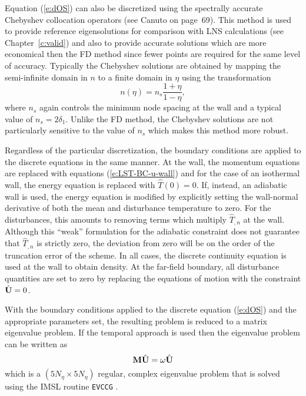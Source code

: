 Equation (\ref{e:dOS}) can also be discretized using the spectrally accurate
Chebyshev collocation operators (see Canuto \etal \cite{CaHuQuZa:88} on
page~69).  This method is used to provide reference eigensolutions for
comparison with LNS calculations (see Chapter~\ref{c:valid}) and also to
provide accurate solutions which are more economical then the FD method since
fewer points are required for the same level of accuracy.  Typically the
Chebyshev solutions are obtained by mapping the semi-infinite domain in $n$ to
a finite domain in $\eta$ using the transformation
%
\begin{equation}
  n(\eta) = n_s \frac{1+\eta}{1-\eta} \comma
\end{equation}
%
where $n_s$ again controls the minimum node spacing at the wall and a typical
value of $n_s = 2 \delta_1$.  Unlike the FD method, the Chebyshev solutions
are not particularly sensitive to the value of $n_s$ which makes this method
more robust.

Regardless of the particular discretization, the boundary conditions are
applied to the discrete equations in the same manner.  At the wall, the
momentum equations are replaced with equations (\ref{e:LST-BC-u-wall}) and for
the case of an isothermal wall, the energy equation is replaced with $\hat
T(0) = 0$.  If, instead, an adiabatic wall is used, the energy equation is
modified by explicitly setting the wall-normal derivative of both the mean and
disturbance temperature to zero.  For the disturbances, this amounts to
removing terms which multiply $\hat T_{,n}$ at the wall.  Although this
``weak'' formulation for the adiabatic constraint does not guarantee that
$\hat T_{,n}$ is strictly zero, the deviation from zero will be on the order
of the truncation error of the scheme.  In all cases, the discrete continuity
equation is used at the wall to obtain density.  At the far-field boundary,
all disturbance quantities are set to zero by replacing the equations of
motion with the constraint ${\hat{\bf U}} = 0$.

With the boundary conditions applied to the discrete equation (\ref{e:dOS})
and the appropriate parameters set, the resulting problem is reduced to a
matrix eigenvalue problem.  If the temporal approach is used then the
eigenvalue problem can be written as
%
\begin{equation}
  {\bf M} {\hat{\bf U}} = \omega {\hat{\bf U}}
\end{equation}
%
which is a $(5N_\eta \times 5N_\eta)$ regular, complex eigenvalue problem that
is solved using the IMSL routine {\tt EVCCG} \cite{IMSL:91}.


